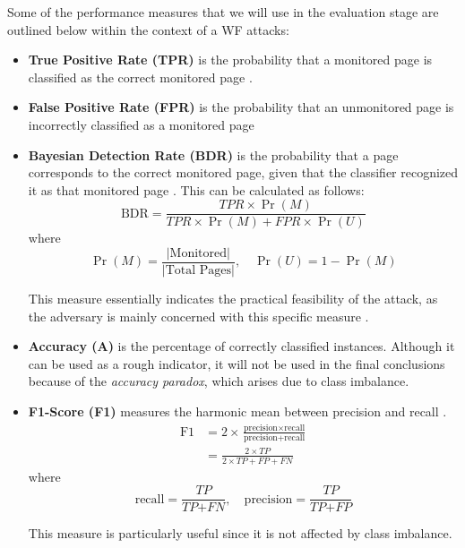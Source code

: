 Some of the performance measures that we will use in the evaluation stage are outlined below within the context of a WF attacks:
\begin{itemize}
  \item \textbf{True Positive Rate (TPR)} is the probability that a monitored page is classified as the correct monitored page \cite{kfingerprinting}.

  \item \textbf{False Positive Rate (FPR)} is the probability that an unmonitored page is incorrectly classified as a monitored page \cite{kfingerprinting}

  \item \textbf{Bayesian Detection Rate (BDR)} is the probability that a page corresponds to the correct monitored page, given that the classifier recognized it as that monitored page \cite{kfingerprinting}.
    This can be calculated as follows:
    $$\text{BDR} = \frac{\textit{TPR} \times \Pr(M)}{\textit{TPR} \times \Pr(M) + \textit{FPR} \times \Pr(U)}$$
    where
    $$\Pr(M) = \frac{|\text{Monitored}|}{|\text{Total Pages}|}, \quad \Pr(U) = 1 - \Pr(M)$$

    This measure essentially indicates the practical feasibility of the attack, as the adversary is mainly concerned with this specific measure \cite{kfingerprinting}.

  \item \textbf{Accuracy (A)} is the percentage of correctly classified instances.
    Although it can be used as a rough indicator, it will not be used in the final conclusions because of the \textit{accuracy paradox}, which arises due to class imbalance.

  \item \textbf{F1-Score (F1)} measures the harmonic mean between precision and recall \cite{scikitlearn}.
    \begin{align*}
      \text{F1} &= 2 \times \frac{\text{precision} \times \text{recall}}{\text{precision} + \text{recall}}\\
                &= \frac{2 \times \textit{TP}}{2 \times \textit{TP} + \textit{FP} + \textit{FN}}
    \end{align*}
    where
    $$\text{recall} = \frac{\textit{TP}}{\textit{TP} + \textit{FN}}, \quad \text{precision} = \frac{\textit{TP}}{\textit{TP} + \textit{FP}}$$

    This measure is particularly useful since it is not affected by class imbalance.
\end{itemize}

